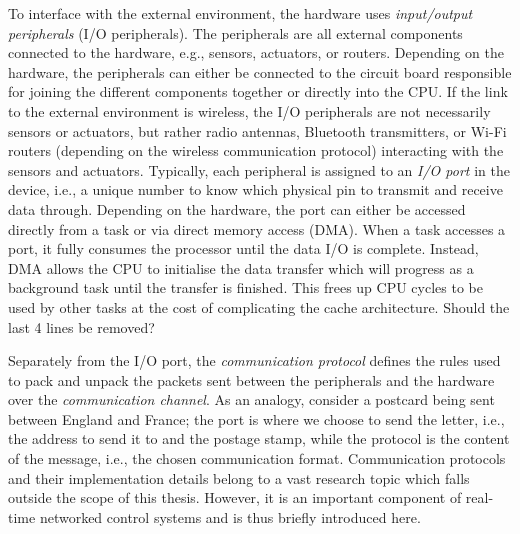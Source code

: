 To interface with the external environment, the hardware uses \emph{input/output peripherals} (I/O peripherals).
The peripherals are all external components connected to the hardware, e.g., sensors, actuators, or routers.
Depending on the hardware, the peripherals can either be connected to the circuit board responsible for joining the different components together or directly into the CPU.
If the link to the external environment is wireless, the I/O peripherals are not necessarily sensors or actuators, but rather radio antennas, Bluetooth transmitters, or Wi-Fi routers (depending on the wireless communication protocol) interacting with the sensors and actuators.
Typically, each peripheral is assigned to an \emph{I/O port} in the device, i.e., a unique number to know which physical pin to transmit and receive data through. 
Depending on the hardware, the port can either be accessed directly from a task or via direct memory access (DMA).
When a task accesses a port, it fully consumes the processor until the data I/O is complete.
Instead, DMA allows the CPU to initialise the data transfer which will progress as a background task until the transfer is finished.
This frees up CPU cycles to be used by other tasks at the cost of complicating the cache architecture.
\question%
{Should the last 4 lines be removed?}
{}

Separately from the I/O port, the \emph{communication protocol} defines the rules used to pack and unpack the packets sent between the peripherals and the hardware over the \emph{communication channel}.
As an analogy, consider a postcard being sent between England and France; the port is where we choose to send the letter, i.e., the address to send it to and the postage stamp, while the protocol is the content of the message, i.e., the chosen communication format.
Communication protocols and their implementation details belong to a vast research topic which falls outside the scope of this thesis.
However, it is an important component of real-time networked control systems and is thus briefly introduced here.

